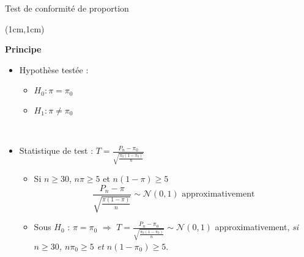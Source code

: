 \documentclass{beamer}
\begin{document}
  

\begin{frame}{Test de conformité de proportion}
\begin{textblock*}{\textwidth}(1cm,1cm)

\begin{center}{\bf \Large Principe  } \end{center}

\begin{itemize}
\item Hypothèse testée :
\begin{itemize}
\item  $H_0 : \pi=\pi_0$
\item $H_1 : \pi \neq \pi_0$
\end{itemize}

\

\item Statistique de test : $\displaystyle T=\frac{ P_n-\pi_0}{\sqrt{\frac{\pi_0 (1-\pi_0)}{n}}}$
\begin{itemize}
\item Si  $n\geq 30$, $n\pi\geq 5$ et $n(1-\pi)\geq 5$
$$\displaystyle \frac{ P_n-\pi}{\sqrt{\frac{\pi(1-\pi)}{n}}}
\sim \mathcal{N}(0,1) \text{ approximativement}$$
\item Sous $H_0$ : $\pi=\pi_0$ $\Rightarrow$
$\displaystyle T=\frac{ P_n-\pi_0}{\sqrt{\frac{\pi_0(1-\pi_0)}{n}}} \sim \mathcal{N}(0,1)$ approximativement, \emph{si $n\geq 30$, $n\pi_0\geq 5$ et $n(1-\pi_0)\geq 5$}.
\end{itemize}
\end{itemize}
\end{textblock*}

\end{frame}

\end{document}
